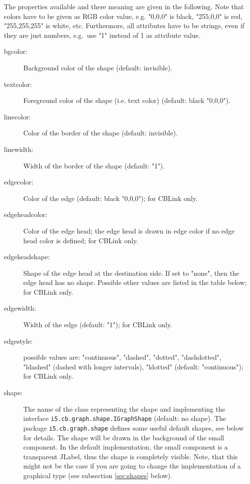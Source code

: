 The properties available and there meaning are given in the
following. Note that colors have to be given as RGB color value,
e.g. "0,0,0" is black, "255,0,0" is red, "255,255,255" is white, etc.
Furthermore, all attributes have to be strings, even if they are
just numbers, e.g.\ use "1" instead of 1 as attribute value.

\begin{description}
\item[bgcolor:]
    Background color of the shape (default: invisible).

\item[textcolor:]
    Foreground color of the shape (i.e. text color)  (default: black "0,0,0").

\item[linecolor:]
    Color of the border of the shape (default: invisible).

\item[linewidth:]
    Width of the border of the shape (default: "1").

\item[edgecolor:]
    Color of the edge (default: black "0,0,0"); for CBLink only.

\item[edgeheadcolor:]
    Color of the edge head; the edge head is drawn in edge color
    if no edge head color is defined; for CBLink only.

\item[edgeheadshape:]
    Shape of the edge head at the destination side. If set to "none",
    then the edge head has no shape. Possible other values are listed in the table below;
    for CBLink only.

\item[edgewidth:]
    Width of the edge (default: "1"); for CBLink only.

\item[edgestyle:]
    possible values are: "continuous", "dashed", "dotted", "dashdotted", "ldashed" (dashed with longer
    intervals), "ldotted"   (default: "continuous"); for CBLink only.

\item[shape:]
    The name of the class representing the shape and implementing the
    interface  {\tt i5.cb.graph.\-shape.IGraphShape} (default: no shape).
    The package {\tt i5.cb.graph.shape} defines some useful default shapes,
    see below for details. The shape will be drawn in the background
    of the small component. In the default implementation, the small
    component is a transparent JLabel, thus the shape is completely
    visible. Note, that this might not be the case if you are going
   to change the implementation of a graphical type (see subsection \ref{sec:shapes} below). 


\end{description}
